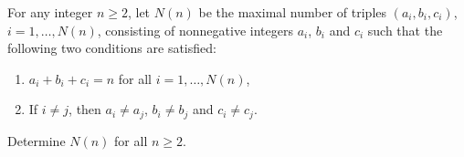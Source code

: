 For any integer $n \geq 2$, let $N(n)$ be the maximal number of triples $(a_i, b_i, c_i)$, $i = 1, \ldots, N(n)$, consisting of nonnegative integers $a_i$, $b_i$ and $c_i$ such that the following two conditions are satisfied:
\begin{enumerate}
\item[(1)] $a_i + b_i + c_i = n$ for all $i = 1, \ldots, N(n)$,
\item[(2)] If $i \neq j$, then $a_i \neq a_j$, $b_i \neq b_j$ and $c_i \neq c_j$.
\end{enumerate}
Determine $N(n)$ for all $n \geq 2$.
